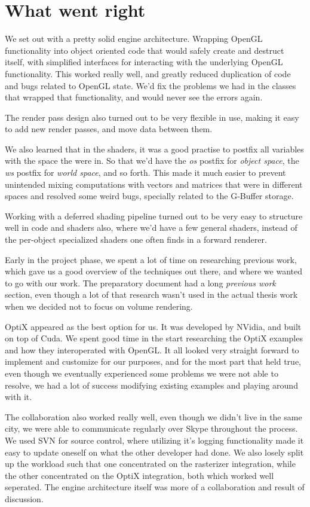 \section{What went right}
We set out with a pretty solid engine architecture. Wrapping OpenGL functionality into object oriented code that would safely create and destruct itself, with simplified interfaces for interacting with the underlying OpenGL functionality. This worked really well, and greatly reduced duplication of code and bugs related to OpenGL state. We'd fix the problems we had in the classes that wrapped that functionality, and would never see the errors again.

The render pass design also turned out to be very flexible in use, making it easy to add new render passes, and move data between them.

We also learned that in the shaders, it was a good practise to postfix all variables with the space the were in. So that we'd have the \emph{os} postfix for \emph{object space}, the \emph{ws} postfix for \emph{world space}, and so forth. This made it much easier to prevent unintended mixing computations with vectors and matrices that were in different spaces and resolved some weird bugs, specially related to the G-Buffer storage.

Working with a deferred shading pipeline turned out to be very easy to structure well in code and shaders also, where we'd have a few general shaders, instead of the per-object specialized shaders one often finds in a forward renderer.

Early in the project phase, we spent a lot of time on researching previous work, which gave us a good overview of the techniques out there, and where we wanted to go with our work. The preparatory document had a long \emph{previous work} section, even though a lot of that research wasn't used in the actual thesis work when we decided not to focus on volume rendering.

OptiX appeared as the best option for us. It was developed by NVidia, and built on top of Cuda. We spent good time in the start researching the OptiX examples and how they interoperated with OpenGL. It all looked very straight forward to implement and customize for our purposes, and for the most part that held true, even though we eventually experienced some problems we were not able to resolve, we had a lot of success modifying existing examples and playing around with it.

The collaboration also worked really well, even though we didn't live in the same city, we were able to communicate regularly over Skype throughout the process. We used SVN for source control, where utilizing it's logging functionality made it easy to update oneself on what the other developer had done. We also losely split up the workload such that one concentrated on the rasterizer integration, while the other concentrated on the OptiX integration, both which worked well seperated. The engine architecture itself was more of a collaboration and result of discussion.

